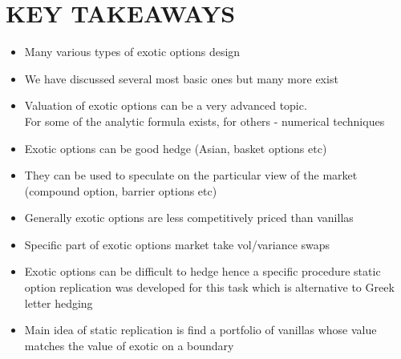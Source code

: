 \documentclass{article}
\begin{document}
\section{KEY TAKEAWAYS}
\begin{itemize}
    \item Many various types of exotic options design
    \item We have discussed several most basic ones but many more exist
    \item Valuation of exotic options can be a very advanced topic. \\For some of the analytic formula exists, for others - numerical techniques
    \item Exotic options can be good hedge (Asian, basket options etc)
    \item They can be used to speculate on the particular view of the market\\ (compound option, barrier options etc)
    \item Generally exotic options are less competitively priced than vanillas
    \item Specific part of exotic options market take vol/variance swaps
    \item Exotic options can be difficult to hedge hence a specific procedure static option replication was developed for this task which is alternative to Greek letter hedging
    \item Main idea of static replication is find a portfolio of vanillas whose value matches the value of exotic on a boundary
\end{itemize}
\end{document}
